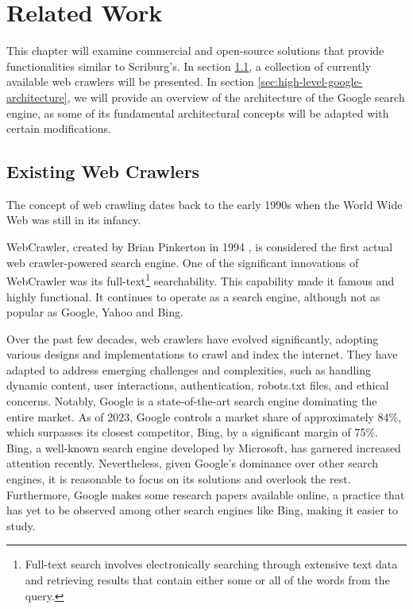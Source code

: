\chapter{Related Work}
\label{chap:relatedwork}

This chapter will examine commercial and open-source solutions that provide functionalities similar to Scriburg's. In section \ref{sec:existing-web-crawlers}, a collection of currently available web crawlers will be presented. In section \ref{sec:high-level-google-architecture}, we will provide an overview of the architecture of the Google search engine, as some of its fundamental architectural concepts will be adapted with certain modifications.

\section{Existing Web Crawlers}\label{sec:existing-web-crawlers}
The concept of web crawling dates back to the early 1990s when the World Wide Web was still in its infancy.

WebCrawler, created by Brian Pinkerton in 1994 \cite{pinkerton2000webcrawler}, is considered the first actual web crawler-powered search engine. One of the significant innovations of WebCrawler was its full-text\footnote{Full-text search involves electronically searching through extensive text data and retrieving results that contain either some or all of the words from the query.} searchability. This capability made it famous and highly functional. It continues to operate as a search engine, although not as popular as Google, Yahoo and Bing.

Over the past few decades, web crawlers have evolved significantly, adopting various designs and implementations to crawl and index the internet. They have adapted to address emerging challenges and complexities, such as handling dynamic content, user interactions, authentication, robots.txt files, and ethical concerns. Notably, Google is a state-of-the-art search engine dominating the entire market. As of 2023, Google controls a market share of approximately 84\%\cite{statista}, which surpasses its closest competitor, Bing, by a significant margin of 75\%. Bing, a well-known search engine developed by Microsoft, has garnered increased attention recently. Nevertheless, given Google's dominance over other search engines, it is reasonable to focus on its solutions and overlook the rest. Furthermore, Google makes some research papers available online, a practice that has yet to be observed among other search engines like Bing, making it easier to study.

